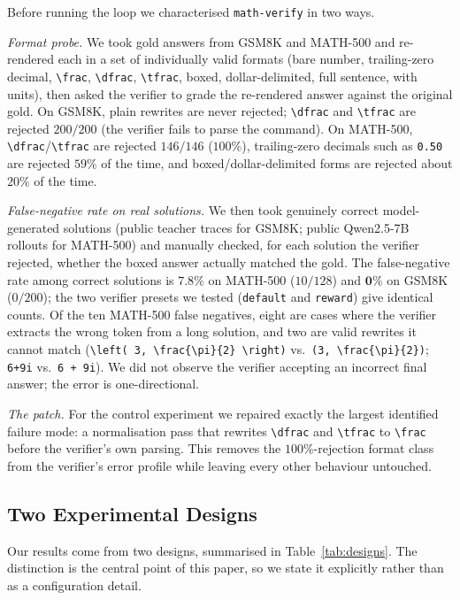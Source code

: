 \documentclass[runningheads]{llncs}
\begin{document}
Before running the loop we characterised \texttt{math-verify} in two ways.

\emph{Format probe.} We took gold answers from GSM8K and MATH-500 and
re-rendered each in a set of individually valid formats (bare number,
trailing-zero decimal, \verb|\frac|, \verb|\dfrac|, \verb|\tfrac|, boxed,
dollar-delimited, full sentence, with units), then asked the verifier to
grade the re-rendered answer against the original gold. On GSM8K, plain
rewrites are never rejected; \verb|\dfrac| and \verb|\tfrac| are rejected
$200/200$ (the verifier fails to parse the command). On MATH-500,
\verb|\dfrac|/\verb|\tfrac| are rejected $146/146$ ($100\%$),
trailing-zero decimals such as \texttt{0.50} are rejected $59\%$ of the
time, and boxed/dollar-delimited forms are rejected about $20\%$ of the
time.

\emph{False-negative rate on real solutions.} We then took genuinely
correct model-generated solutions (public teacher traces for GSM8K; public
Qwen2.5-7B rollouts for MATH-500) and manually checked, for each solution
the verifier rejected, whether the boxed answer actually matched the gold.
The false-negative rate among correct solutions is $\mathbf{7.8\%}$ on
MATH-500 ($10/128$) and $\mathbf{0\%}$ on GSM8K ($0/200$); the two verifier
presets we tested (\texttt{default} and \texttt{reward}) give identical
counts. Of the ten MATH-500 false negatives, eight are cases where the
verifier extracts the wrong token from a long solution, and two are valid
rewrites it cannot match (\verb|\left( 3, \frac{\pi}{2} \right)| vs.\
\verb|(3, \frac{\pi}{2})|; \verb|6+9i| vs.\ \verb|6 + 9i|). We did not
observe the verifier accepting an incorrect final answer; the error is
one-directional.

\emph{The patch.} For the control experiment we repaired exactly the
largest identified failure mode: a normalisation pass that rewrites
\verb|\dfrac| and \verb|\tfrac| to \verb|\frac| before the verifier's own
parsing. This removes the $100\%$-rejection format class from the
verifier's error profile while leaving every other behaviour untouched.

\subsection{Two Experimental Designs}
\label{sec:designs}

Our results come from two designs, summarised in
Table~\ref{tab:designs}. The distinction is the central point of this
paper, so we state it explicitly rather than as a configuration detail.
\end{document}
